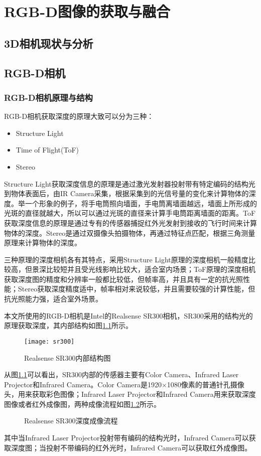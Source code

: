 \chapter{RGB-D图像的获取与融合}
\label{chap:rgbd}

\section{3D相机现状与分析}

\section{RGB-D相机}
\subsection{RGB-D相机原理与结构}
RGB-D相机获取深度的原理大致可以分为三种：
\begin{itemize}
\item Structure Light
\item Time of Flight(ToF)
\item Stereo
\end{itemize}

Structure Light获取深度信息的原理是通过激光发射器投射带有特定编码的结构光到物体表面后，由IR Camera采集，根据采集到的光信号量的变化来计算物体的深度。举一个形象的例子，将手电筒照向墙面，手电筒离墙面越远，墙面上所形成的光斑的直径就越大，所以可以通过光斑的直径来计算手电筒距离墙面的距离。ToF获取深度信息的原理是通过专有的传感器捕捉红外光发射到接收的飞行时间来计算物体的深度。Stereo是通过双摄像头拍摄物体，再通过特征点匹配，根据三角测量原理来计算物体的深度。

三种原理的深度相机各有其特点，采用Structure Light原理的深度相机一般精度比较高，但景深比较短并且受光线影响比较大，适合室内场景；ToF原理的深度相机获取深度图的精度和分辨率一般都比较低，但帧率高，并且具有一定的抗光照性能；Stereo获取深度精度适中，帧率相对来说较低，并且需要较强的计算性能，但抗光照能力强，适合室外场景。

本文所使用的RGB-D相机是Intel的Realsense SR300相机，SR300采用的结构光的原理获取深度，其内部结构如图\ref{fig:sr300}所示。
\begin{figure}[!ht]
  \centering
  \texttt{[image: sr300]}
  \caption{Realsense SR300内部结构图}
  \label{fig:sr300}
\end{figure}
从图\ref{fig:sr300}可以看出，SR300内部的传感器主要有Color Camera、Infrared Laser Projector和Infrared Camera。Color Camera是1920×1080像素的普通针孔摄像头，用来获取彩色图像；Infrared Laser Projector和Infrared Camera用来获取深度图像或者红外成像图，两种成像流程如图\ref{fig:capture_flow}所示。
\begin{figure}[!ht]
  \centering
  \vfill
  \caption{Realsense SR300深度成像流程}
  \label{fig:capture_flow}
\end{figure}
其中当Infrared Laser Projector投射带有编码的结构光时，Infrared Camera可以获取深度图；当投射不带编码的红外光时，Infrared Camera可以获取红外成像图。

